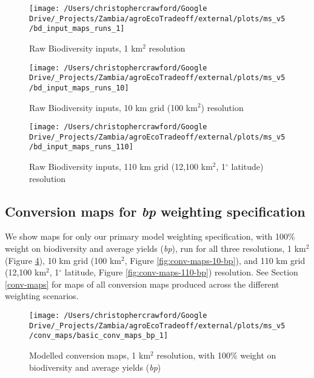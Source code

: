 \documentclass[
]{article}
\begin{document}
\begin{figure}
\texttt{[image: /Users/christophercrawford/Google Drive/\_Projects/Zambia/agroEcoTradeoff/external/plots/ms\_v5/bd\_input\_maps\_runs\_1]} \caption{Raw Biodiversity inputs, 1 km\(^2\) resolution}\label{fig:bd-inputs-1}
\end{figure}

\begin{figure}
\texttt{[image: /Users/christophercrawford/Google Drive/\_Projects/Zambia/agroEcoTradeoff/external/plots/ms\_v5/bd\_input\_maps\_runs\_10]} \caption{Raw Biodiversity inputs, 10 km grid (100 km\(^2\)) resolution}\label{fig:bd-inputs-10}
\end{figure}

\begin{figure}
\texttt{[image: /Users/christophercrawford/Google Drive/\_Projects/Zambia/agroEcoTradeoff/external/plots/ms\_v5/bd\_input\_maps\_runs\_110]} \caption{Raw Biodiversity inputs, 110 km grid (12,100 km\(^2\), 1\(^{\circ}\) latitude) resolution}\label{fig:bd-inputs-110}
\end{figure}

\newpage

\hypertarget{conversion-maps-for-bp-weighting-specification}{%
\subsection{\texorpdfstring{Conversion maps for \emph{bp} weighting specification}{Conversion maps for bp weighting specification}}\label{conversion-maps-for-bp-weighting-specification}}

We show maps for only our primary model weighting specification, with 100\% weight on biodiversity and average yields (\emph{bp}), run for all three resolutions, 1 km\(^2\) (Figure \ref{fig:conv-maps-1-bp}), 10 km grid (100 km\(^2\), Figure \ref{fig:conv-maps-10-bp}), and 110 km grid (12,100 km\(^2\), 1\(^{\circ}\) latitude, Figure \ref{fig:conv-maps-110-bp}) resolution. See Section \ref{conv-maps} for maps of all conversion maps produced across the different weighting scenarios.





\begin{figure}
\texttt{[image: /Users/christophercrawford/Google Drive/\_Projects/Zambia/agroEcoTradeoff/external/plots/ms\_v5/conv\_maps/basic\_conv\_maps\_bp\_1]} \caption{Modelled conversion maps, 1 km\(^2\) resolution, with 100\% weight on biodiversity and average yields (\emph{bp})}\label{fig:conv-maps-1-bp}
\end{figure}
\end{document}
